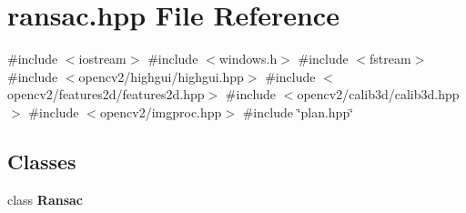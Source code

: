 \section{ransac.\+hpp File Reference}
\label{ransac_8hpp}
{\ttfamily \#include $<$iostream$>$}\newline
{\ttfamily \#include $<$windows.\+h$>$}\newline
{\ttfamily \#include $<$fstream$>$}\newline
{\ttfamily \#include $<$opencv2/highgui/highgui.\+hpp$>$}\newline
{\ttfamily \#include $<$opencv2/features2d/features2d.\+hpp$>$}\newline
{\ttfamily \#include $<$opencv2/calib3d/calib3d.\+hpp$>$}\newline
{\ttfamily \#include $<$opencv2/imgproc.\+hpp$>$}\newline
{\ttfamily \#include \char`\"{}plan.\+hpp\char`\"{}}\newline
\subsection*{Classes}
\begin{DoxyCompactItemize}
\item 
class \textbf{ Ransac}
\end{DoxyCompactItemize}
